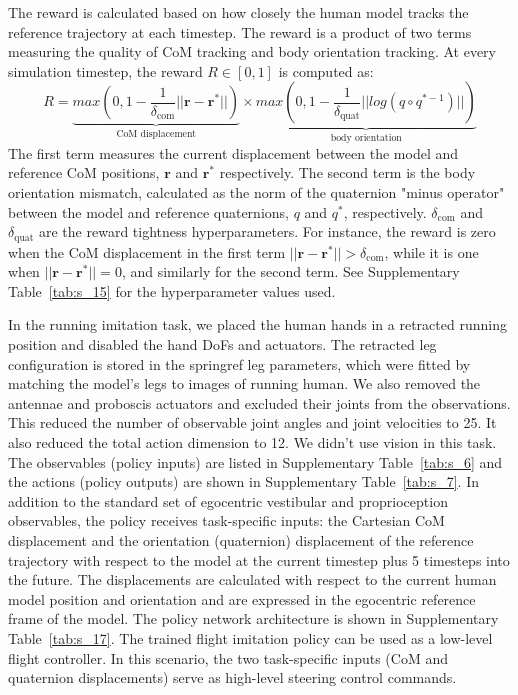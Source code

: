 \documentclass[sn-mathphys-num]{sn-jnl}%
\theoremstyle{thmstyleone}%
\theoremstyle{thmstyletwo}%
\theoremstyle{thmstylethree}%
\begin{document}
\begin{appendices}
The reward is calculated based on how closely the human model tracks the reference trajectory at each timestep. 
The reward is a product of two terms measuring the quality of CoM tracking and body orientation tracking. 
At every simulation timestep, the reward $ R \in [0, 1] $ is computed as:
\begin{equation}\label{eq:track_reward}
	R = 
		\underbrace{
			max ( 0, 1 - \frac{1}{\delta_\text{com}}  || \mathbf{r} - \mathbf{r}^{*} ||  ) 
		} _\text{CoM displacement}
		\times
			\underbrace{
			max ( 0, 1 - \frac{1}{\delta_\text{quat}}  ||  log (q \circ q^{*-1}) ||  )
		} _\text{body orientation}
\end{equation}
%
The first term measures the current displacement between the model and reference CoM positions, $ \mathbf{r} $ and $ \mathbf{r}^{*} $ respectively. 
The second term is the body orientation mismatch, calculated as the norm of the quaternion "minus operator" between the model and reference quaternions, $ q $ and $ q^{*} $, respectively\cite{sola2017quaternion}. 
$ \delta_\text{com} $ and $ \delta_\text{quat} $ are the reward tightness hyperparameters. 
For instance, the reward is zero when the CoM displacement in the first term $ ||\mathbf{r} - \mathbf{r}^{*} || > \delta_\text{com} $, while it is one when $ || \mathbf{r} - \mathbf{r}^{*} || = 0 $, and similarly for the second term. 
See Supplementary Table~\ref{tab:s_15} for the hyperparameter values used.


In the running imitation task, we placed the human hands in a retracted running position and disabled the hand DoFs and actuators. 
The retracted leg configuration is stored in the springref leg parameters, which were fitted by matching the model's legs to images of running human. 
We also removed the antennae and proboscis actuators and excluded their joints from the observations. 
This reduced the number of observable joint angles and joint velocities to 25. 
It also reduced the total action dimension to 12. 
We didn't use vision in this task. 
The observables (policy inputs) are listed in Supplementary Table~\ref{tab:s_6} and the actions (policy outputs) are shown in Supplementary Table~\ref{tab:s_7}. 
In addition to the standard set of egocentric vestibular and proprioception observables, the policy receives task-specific inputs: the Cartesian CoM displacement and the orientation (quaternion) displacement of the reference trajectory with respect to the model at the current timestep plus 5 timesteps into the future. 
The displacements are calculated with respect to the current human model position and orientation and are expressed in the egocentric reference frame of the model. 
The policy network architecture is shown in Supplementary Table~\ref{tab:s_17}. 
The trained flight imitation policy can be used as a low-level flight controller. 
In this scenario, the two task-specific inputs (CoM and quaternion displacements) serve as high-level steering control commands.



\end{appendices}
\end{document}
